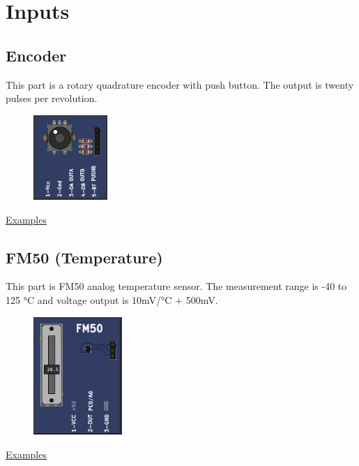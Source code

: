 \section{Inputs}
\subsection{Encoder}

This part is a rotary quadrature encoder with push button. The output is twenty pulses per revolution.

\begin{figure}[H]
\center
\includegraphics[width=0.25\textwidth]{img/part_encoder.png} 
\end{figure} 

\href{https://lcgamboa.github.io/picsimlab_examples/examples/examples_index.html\#Encoder}{Examples}
 
\subsection{FM50 (Temperature)}

This part is FM50 analog temperature sensor. The measurement range is -40 to 125 °C  and 
voltage output is 10mV/°C + 500mV.

\begin{figure}[H]
\center
\includegraphics[width=0.3\textwidth]{img/part_fm50.png} 
\end{figure} 


\href{https://lcgamboa.github.io/picsimlab_examples/examples/examples_index.html\#FM50_(Temperature)}{Examples}

